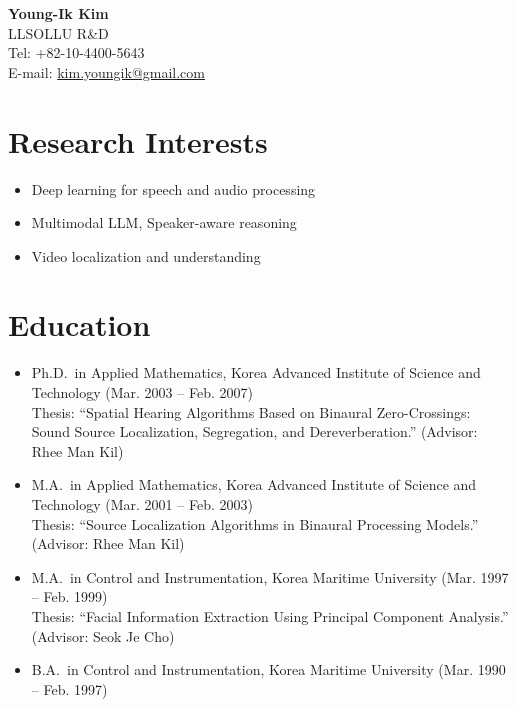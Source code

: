 \documentclass[11pt,a4paper]{article}
\begin{document}
\begin{center}
{\LARGE \textbf{Young-Ik Kim}}\\[0.5em]
LLSOLLU R\&D\\
Tel: +82-10-4400-5643\\
E-mail: \href{mailto:kim.youngik@gmail.com}{kim.youngik@gmail.com}
\end{center}

\section*{Research Interests}
\begin{itemize}[leftmargin=*]
\item Deep learning for speech and audio processing
\item Multimodal LLM, Speaker-aware reasoning
\item Video localization and understanding
\end{itemize}

\section*{Education}
\begin{itemize}[leftmargin=*]
\item Ph.D.\ in Applied Mathematics, Korea Advanced Institute of Science and Technology (Mar. 2003 -- Feb. 2007)\\
Thesis: ``Spatial Hearing Algorithms Based on Binaural Zero-Crossings: Sound Source Localization, Segregation, and Dereverberation.'' (Advisor: Rhee Man Kil)
\item M.A.\ in Applied Mathematics, Korea Advanced Institute of Science and Technology (Mar. 2001 -- Feb. 2003)\\
Thesis: ``Source Localization Algorithms in Binaural Processing Models.'' (Advisor: Rhee Man Kil)
\item M.A.\ in Control and Instrumentation, Korea Maritime University (Mar. 1997 -- Feb. 1999)\\
Thesis: ``Facial Information Extraction Using Principal Component Analysis.'' (Advisor: Seok Je Cho)
\item B.A.\ in Control and Instrumentation, Korea Maritime University (Mar. 1990 -- Feb. 1997)
\end{itemize}
\end{document}
